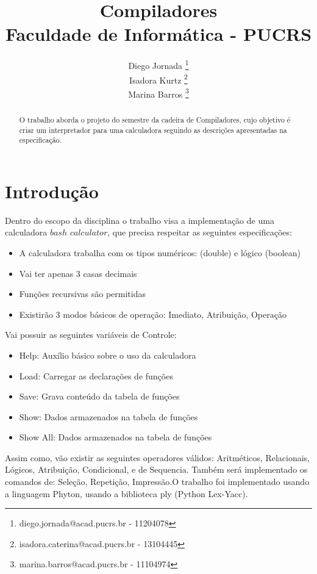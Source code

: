 \documentclass[12pt]{article}
\title{Compiladores\\Faculdade de Informática - PUCRS}
\author{
Diego Jornada \footnote{diego.jornada@acad.pucrs.br - 11204078} \\ 
Isadora Kurtz \footnote{isadora.caterina@acad.pucrs.br - 13104445} \\
Marina Barros \footnote{marina.barros@acad.pucrs.br - 11104974} \\
}
\begin{document}
\maketitle

\begin{abstract}

O trabalho aborda o projeto do semestre da cadeira de Compiladores, cujo objetivo é criar um interpretador para uma calculadora seguindo as descrições apresentadas na especificação. 


\end{abstract}



\section{Introdução}

Dentro do escopo da disciplina o trabalho visa a implementação de uma calculadora $bash$ $calculator$, que precisa respeitar as seguintes especificações: 

\begin{itemize}
    \item  A calculadora trabalha com os tipos numéricos: (double) e lógico (boolean) 
    \item  Vai ter apenas 3 casas decimais
    \item  Funções recursivas são permitidas
    \item  Existirão 3 modos básicos de operação: Imediato, Atribuição, Operação
\end{itemize}
\newpage
Vai possuir as seguintes variáveis de Controle:

\begin{itemize}
    \item  Help: Auxílio básico sobre o uso da calculadora
    \item  Load: Carregar as declarações de funções
    \item  Save: Grava conteúdo da tabela de funções
    \item  Show: Dados armazenados na tabela de funções
    \item  Show All: Dados armazenados na tabela de funções
\end{itemize}

Assim como, vão existir as seguintes operadores válidos: Aritméticos, Relacionais, Lógicos, Atribuição, Condicional, e de Sequencia.
Também será implementado os comandos de: Seleção, Repetição, Impressão.O trabalho foi implementado usando a linguagem Phyton, usando a biblioteca ply (Python Lex-Yacc).
\end{document}
